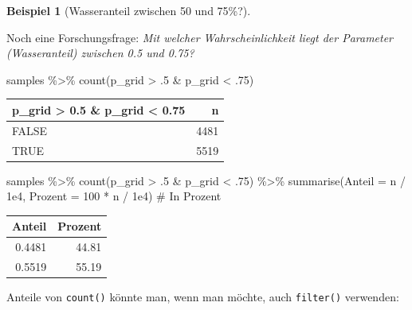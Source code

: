 \documentclass[
  a4paper,
  DIV=11]{scrreprt}
\newenvironment{Shaded}{\begin{snugshade}}{\end{snugshade}}
\newcommand{\AttributeTok}[1]{\textcolor[rgb]{0.40,0.45,0.13}{#1}}
\newcommand{\CommentTok}[1]{\textcolor[rgb]{0.37,0.37,0.37}{#1}}
\newcommand{\DecValTok}[1]{\textcolor[rgb]{0.68,0.00,0.00}{#1}}
\newcommand{\FloatTok}[1]{\textcolor[rgb]{0.68,0.00,0.00}{#1}}
\newcommand{\FunctionTok}[1]{\textcolor[rgb]{0.28,0.35,0.67}{#1}}
\newcommand{\NormalTok}[1]{\textcolor[rgb]{0.00,0.23,0.31}{#1}}
\newcommand{\SpecialCharTok}[1]{\textcolor[rgb]{0.37,0.37,0.37}{#1}}
\theoremstyle{definition}
\newtheorem{example}{Beispiel}[chapter]
\theoremstyle{remark}
\begin{document}
\leavevmode{}%
\begin{example}[Wasseranteil zwischen 50 und 75\%?]\label{exm-param2}

Noch eine Forschungsfrage: \emph{Mit welcher Wahrscheinlichkeit liegt
der Parameter (Wasseranteil) zwischen 0.5 und 0.75?}

\begin{Shaded}
\begin{Highlighting}[]
\NormalTok{samples }\SpecialCharTok{\%\textgreater{}\%} 
  \FunctionTok{count}\NormalTok{(p\_grid }\SpecialCharTok{\textgreater{}}\NormalTok{ .}\DecValTok{5} \SpecialCharTok{\&}\NormalTok{ p\_grid }\SpecialCharTok{\textless{}}\NormalTok{ .}\DecValTok{75}\NormalTok{)}
\end{Highlighting}
\end{Shaded}

\begin{longtable}[]{@{}lr@{}}
\toprule()
p\_grid \textgreater{} 0.5 \& p\_grid \textless{} 0.75 & n \\
\midrule()
\endhead
FALSE & 4481 \\
TRUE & 5519 \\
\bottomrule()
\end{longtable}

\begin{Shaded}
\begin{Highlighting}[]
\NormalTok{samples }\SpecialCharTok{\%\textgreater{}\%} 
  \FunctionTok{count}\NormalTok{(p\_grid }\SpecialCharTok{\textgreater{}}\NormalTok{ .}\DecValTok{5} \SpecialCharTok{\&}\NormalTok{ p\_grid }\SpecialCharTok{\textless{}}\NormalTok{ .}\DecValTok{75}\NormalTok{) }\SpecialCharTok{\%\textgreater{}\%} 
  \FunctionTok{summarise}\NormalTok{(}\AttributeTok{Anteil =}\NormalTok{ n }\SpecialCharTok{/} \FloatTok{1e4}\NormalTok{,}
            \AttributeTok{Prozent =} \DecValTok{100} \SpecialCharTok{*}\NormalTok{ n }\SpecialCharTok{/} \FloatTok{1e4}\NormalTok{)  }\CommentTok{\# In Prozent}
\end{Highlighting}
\end{Shaded}

\begin{longtable}[]{@{}rr@{}}
\toprule()
Anteil & Prozent \\
\midrule()
\endhead
0.4481 & 44.81 \\
0.5519 & 55.19 \\
\bottomrule()
\end{longtable}

Anteile von \texttt{count()} könnte man, wenn man möchte, auch
\texttt{filter()} verwenden:


\end{example}
\end{document}
